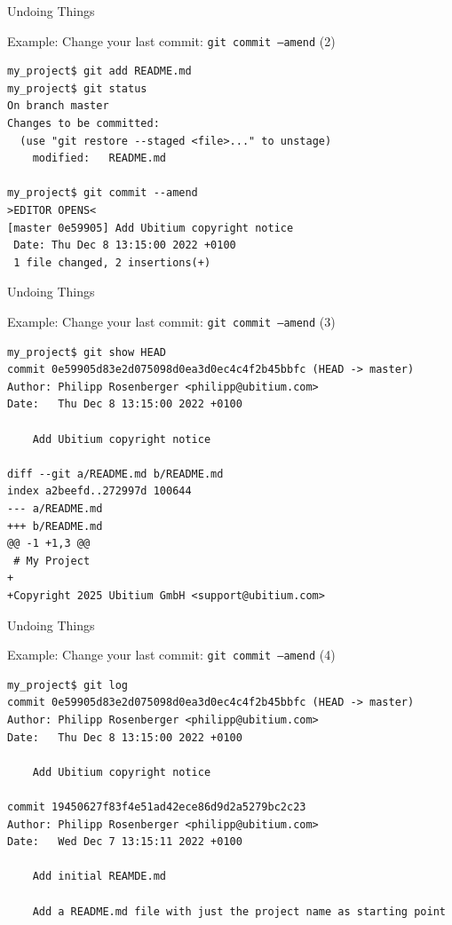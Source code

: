 \documentclass[aspectratio=169]{beamer}
\renewcommand{\footnotesize}{\tiny}
\newcommand{\sectiontitle}{}
\begin{document}
\begin{frame}[fragile]{Undoing Things}{\sectiontitle}
\begin{block}{Example: Change your last commit: \texttt{git commit --amend} {\small(2)}}
\begin{verbatim}
my_project$ git add README.md
my_project$ git status
On branch master
Changes to be committed:
  (use "git restore --staged <file>..." to unstage)
    modified:   README.md

my_project$ git commit --amend
>EDITOR OPENS<
[master 0e59905] Add Ubitium copyright notice
 Date: Thu Dec 8 13:15:00 2022 +0100
 1 file changed, 2 insertions(+)
\end{verbatim}
\end{block}
\end{frame}

\begin{frame}[fragile]{Undoing Things}{\sectiontitle}
\begin{block}{Example: Change your last commit: \texttt{git commit --amend} {\small(3)}}
\begin{verbatim}
my_project$ git show HEAD
commit 0e59905d83e2d075098d0ea3d0ec4c4f2b45bbfc (HEAD -> master)
Author: Philipp Rosenberger <philipp@ubitium.com>
Date:   Thu Dec 8 13:15:00 2022 +0100

    Add Ubitium copyright notice

diff --git a/README.md b/README.md
index a2beefd..272997d 100644
--- a/README.md
+++ b/README.md
@@ -1 +1,3 @@
 # My Project
+
+Copyright 2025 Ubitium GmbH <support@ubitium.com>
\end{verbatim}
\end{block}
\end{frame}

\begin{frame}[fragile]{Undoing Things}{\sectiontitle}
\begin{block}{Example: Change your last commit: \texttt{git commit --amend} {\small(4)}}
\begin{verbatim}
my_project$ git log
commit 0e59905d83e2d075098d0ea3d0ec4c4f2b45bbfc (HEAD -> master)
Author: Philipp Rosenberger <philipp@ubitium.com>
Date:   Thu Dec 8 13:15:00 2022 +0100

    Add Ubitium copyright notice

commit 19450627f83f4e51ad42ece86d9d2a5279bc2c23
Author: Philipp Rosenberger <philipp@ubitium.com>
Date:   Wed Dec 7 13:15:11 2022 +0100

    Add initial REAMDE.md

    Add a README.md file with just the project name as starting point
\end{verbatim}
\end{block}
\end{frame}
\end{document}
